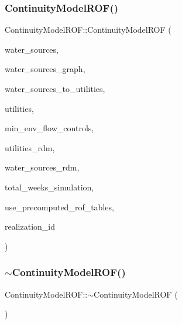 \subsubsection{\texorpdfstring{Continuity\+Model\+R\+O\+F()}{ContinuityModelROF()}}
{\footnotesize\ttfamily Continuity\+Model\+R\+O\+F\+::\+Continuity\+Model\+R\+OF (\begin{DoxyParamCaption}\item[{vector$<$ \mbox{\hyperlink{classWaterSource}{Water\+Source}} $\ast$$>$}]{water\+\_\+sources,  }\item[{const \mbox{\hyperlink{classGraph}{Graph}} \&}]{water\+\_\+sources\+\_\+graph,  }\item[{const vector$<$ vector$<$ int $>$$>$ \&}]{water\+\_\+sources\+\_\+to\+\_\+utilities,  }\item[{vector$<$ \mbox{\hyperlink{classUtility}{Utility}} $\ast$$>$}]{utilities,  }\item[{vector$<$ \mbox{\hyperlink{classMinEnvFlowControl}{Min\+Env\+Flow\+Control}} $\ast$$>$}]{min\+\_\+env\+\_\+flow\+\_\+controls,  }\item[{vector$<$ double $>$ \&}]{utilities\+\_\+rdm,  }\item[{vector$<$ double $>$ \&}]{water\+\_\+sources\+\_\+rdm,  }\item[{unsigned long}]{total\+\_\+weeks\+\_\+simulation,  }\item[{const int}]{use\+\_\+precomputed\+\_\+rof\+\_\+tables,  }\item[{const unsigned long}]{realization\+\_\+id }\end{DoxyParamCaption})}

\mbox{\label{classContinuityModelROF_a0098bd7efa9e57a7ff0efc4c9b5aa340_a0098bd7efa9e57a7ff0efc4c9b5aa340}} 
\subsubsection{\texorpdfstring{$\sim$\+Continuity\+Model\+R\+O\+F()}{~ContinuityModelROF()}}
{\footnotesize\ttfamily Continuity\+Model\+R\+O\+F\+::$\sim$\+Continuity\+Model\+R\+OF (\begin{DoxyParamCaption}{ }\end{DoxyParamCaption})\hspace{0.3cm}{\ttfamily [virtual]}}



